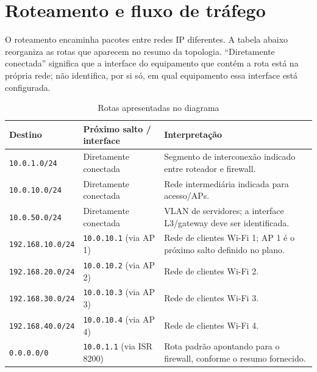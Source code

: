 \documentclass[11pt,a4paper]{article}
\begin{document}
\section{Roteamento e fluxo de tráfego}

O roteamento encaminha pacotes entre redes IP diferentes. A tabela abaixo reorganiza as rotas que aparecem no resumo da topologia. ``Diretamente conectada'' significa que a interface do equipamento que contém a rota está na própria rede; não identifica, por si só, em qual equipamento essa interface está configurada.

\begin{table}[h]
\centering
\caption{Rotas apresentadas no diagrama}
\label{tab:rotas}
\begin{tabularx}{\textwidth}{@{}l l X@{}}
\toprule
\textbf{Destino} & \textbf{Próximo salto / interface} & \textbf{Interpretação} \\
\midrule
\texttt{10.0.1.0/24} & Diretamente conectada & Segmento de interconexão indicado entre roteador e firewall. \\
\texttt{10.0.10.0/24} & Diretamente conectada & Rede intermediária indicada para acesso/APs. \\
\texttt{10.0.50.0/24} & Diretamente conectada & VLAN de servidores; a interface L3/gateway deve ser identificada. \\
\texttt{192.168.10.0/24} & \texttt{10.0.10.1} (via AP 1) & Rede de clientes Wi-Fi 1; AP 1 é o próximo salto definido no plano. \\
\texttt{192.168.20.0/24} & \texttt{10.0.10.2} (via AP 2) & Rede de clientes Wi-Fi 2. \\
\texttt{192.168.30.0/24} & \texttt{10.0.10.3} (via AP 3) & Rede de clientes Wi-Fi 3. \\
\texttt{192.168.40.0/24} & \texttt{10.0.10.4} (via AP 4) & Rede de clientes Wi-Fi 4. \\
\texttt{0.0.0.0/0} & \texttt{10.0.1.1} (via ISR 8200) & Rota padrão apontando para o firewall, conforme o resumo fornecido. \\
\bottomrule
\end{tabularx}
\end{table}
\end{document}
